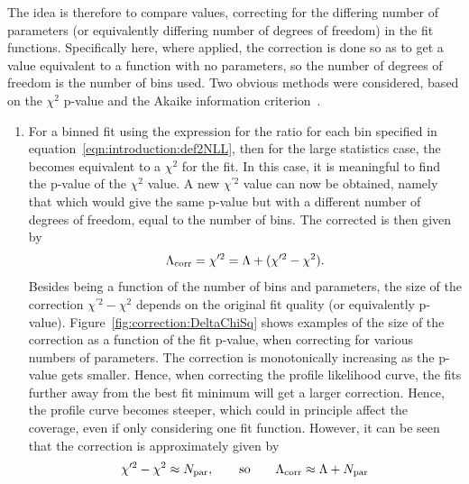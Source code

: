 The idea is therefore to compare \nll values,
correcting for the differing number of parameters
(or equivalently differing number of degrees of freedom) in
the fit functions. Specifically here, where applied, the correction is
done so as to get a value equivalent to a function with no parameters, so
the number of degrees of freedom is the number of bins used.
Two obvious methods were considered, based on the
$\chi^2$ p-value and the Akaike information
criterion~\cite{ref:correction:akaike}.
\begin{enumerate}
\item %
For a binned fit using the expression for the \nll ratio
for each bin specified in equation~\ref{eqn:introduction:def2NLL}, then for
the large statistics case, the \nll becomes equivalent to a $\chi^2$ for the
fit. In this case, it is meaningful to find the p-value of the $\chi^2$ value.
A new $\chi^{\prime 2}$
value can now be obtained, namely that which would give the same p-value but
with a different number of degrees of freedom, equal to the number of bins.
The corrected \nll is then given by
\begin{displaymath}
\Lambda_{\mathrm{corr}} = \chi^{\prime 2} = \textrm{\ensuremath{\Lambda}} + (\chi^{\prime 2} - \chi^2).
\end{displaymath}
Besides being a function of the number of bins and parameters,
the size of the correction $\chi^{\prime 2} - \chi^2$
depends on the original fit quality
(or equivalently p-value). Figure~\ref{fig:correction:DeltaChiSq}
shows examples of the size of the correction as a function of the
fit p-value, when correcting for various numbers of parameters.
The correction is monotonically increasing as the p-value gets smaller.
Hence, when correcting the profile likelihood curve, the fits further away from
the best fit minimum will get a larger correction. Hence, the profile curve
becomes steeper, which could in principle affect the coverage, even if
only considering one fit function.
However, it can be seen that the correction is approximately given by
\begin{displaymath}
\chi^{\prime 2} - \chi^2 \approx N_{\rm par},
\qquad{\rm so}\qquad
\Lambda_{\mathrm{corr}} \approx \textrm{\ensuremath{\Lambda}} + N_{\rm par}
\end{displaymath}

\end{enumerate}
